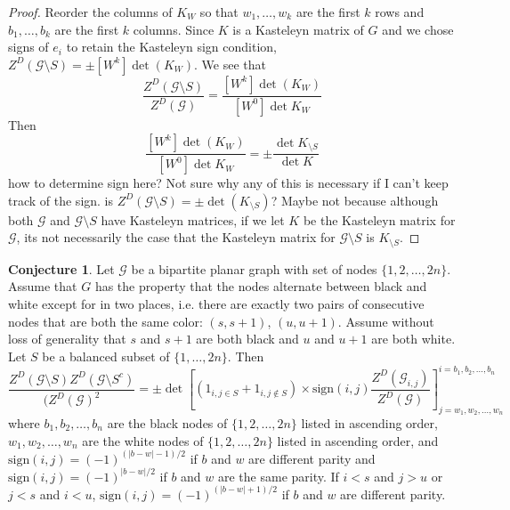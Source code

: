 \documentclass[11pt]{amsart}
\theoremstyle{definition}
\newtheorem*{conj*}{Conjecture}
\begin{document}
\begin{proof}
 Reorder the columns of $K_{W}$ so that $w_1, \ldots, w_k$ are the first $k$ rows and $b_1, \ldots, b_k$ are the first $k$ columns. Since $K$ is a Kasteleyn matrix of $G$ and we chose signs of $e_i$ to retain the Kasteleyn sign condition, $Z^{D}(\mathcal{G} \setminus S) = \pm [W^{k}] \det(K_{W})$. 
We see that
$$\dfrac{ Z^{D}(\mathcal{G} \setminus S)}{Z^{D}(\mathcal{G})} = \dfrac{ [W^{k}] \det(K_{W}) }{[W^{0}] \det K_{W}}$$
Then
$$ \dfrac{ [W^{k}] \det(K_{W}) }{[W^{0}] \det K_{W}} = \pm \dfrac{ \det K_{\setminus S} }{ \det K }$$
how to determine sign here?
Not sure why any of this is necessary if I can't keep track of the sign. 
is $Z^{D}(\mathcal{G} \setminus S) = \pm \det (K_{\setminus S})$? Maybe not because although both $\mathcal{G}$ and $\mathcal{G} \setminus S$ have Kasteleyn matrices, if we let $K$ be the Kasteleyn matrix for $\mathcal{G}$, its not necessarily the case that the Kasteleyn matrix for $\mathcal{G} \setminus S$ is $K_{\setminus S}$. 

\end{proof}


\begin{conj*}
Let $\mathcal{G}$ be a bipartite planar graph with set of nodes $\{1, 2, \ldots, 2n\}$. Assume that $G$ has the property that the nodes alternate between black and white except for in two places, i.e. there are exactly two pairs of consecutive nodes that are both the same color: $(s, s+1)$, $(u,u+1)$. Assume without loss of generality that $s$ and $s+1$ are both black and $u$ and $u+1$ are both white. Let $S$ be a balanced subset of $\{1, \ldots, 2n\}$. Then 
$$\dfrac{Z^{D}(\mathcal{G} \setminus S) Z^{D}(\mathcal{G} \setminus S^{c})}{(Z^{D}(\mathcal{G})^{2}} = \pm
\det \left[(1_{i, j \in S} + 1_{i, j \notin S}) \times \text{sign}(i, j) \dfrac{Z^{D}(\mathcal{G}_{i, j})}{Z^{D}(\mathcal{G})} \right]^{i = b_1, b_2, \ldots, b_n}_{j = w_1, w_2, \ldots, w_n}$$
where $b_1, b_2, \ldots, b_n$ are the black nodes of $\{1, 2, \ldots, 2n\}$ listed in ascending order,$w_1, w_2, \ldots, w_n$ are the white nodes of $\{1, 2, \ldots, 2n\}$ listed in ascending order, and $\text{sign}(i, j) = (-1)^{(|b-w| -1)/2}$ if $b$ and $w$ are different parity and $\text{sign}(i, j) = (-1)^{|b-w|/2}$ if $b$ and $w$ are the same parity. If $i < s$ and $j > u$ or $j < s$ and $i < u$, $\text{sign}(i, j) = (-1)^{(|b-w| +1)/2}$ if $b$ and $w$ are different parity.
\end{conj*}
\end{document}
